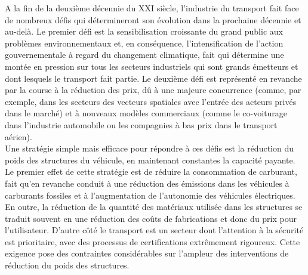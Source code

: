 A la fin de la deuxi\`eme d\'ecennie du XXI si\`ecle, l'industrie du transport fait face de nombreux d\'efis qui d\'etermineront son \'evolution dans la prochaine d\'ecennie et au-del\`a. Le premier d\'efi est la sensibilisation croissante du grand public aux probl\`emes environnementaux et, en cons\'equence, l'intensification de l'action gouvernementale \`a regard du changement climatique, fait qui d\'etermine une mont\'ee en pression sur tous les secteurs industriels qui sont grands \'emetteurs et dont lesquels le transport fait partie. Le deuxi\`eme d\'efi est repr\'esent\'e en revanche par la course \`a la r\'eduction des prix, d\^u \`a une majeure concurrence (comme, par exemple, dans les secteurs des vecteurs spatiales avec l'entr\'ee des acteurs priv\'es dans le march\'e) et \`a nouveaux mod\`eles commerciaux (comme le co-voiturage dans l'industrie automobile ou les compagnies \`a bas prix dans le transport a\'erien).\\
Une strat\'egie simple mais efficace pour r\'epondre \`a ces d\'efis est la r\'eduction du poids des structures du v\'ehicule, en maintenant constantes la capacit\'e payante. Le premier effet de cette strat\'egie est de r\'eduire la consommation de carburant, fait qu'en revanche conduit \`a une r\'eduction des \'emissions dans les v\'ehicules \`a carburants fossiles et \`a l'augmentation de l'autonomie des v\'ehicules \'electriques. En outre, la r\'eduction de la quantit\'e des mat\'eriaux utilis\'ee dans les structures se traduit souvent en une r\'eduction des co\^uts de fabrications et donc du prix pour l'utilisateur. D'autre c\^ot\'e le transport est un secteur dont l'attention \`a la s\'ecurit\'e est prioritaire, avec des processus de certifications extr\^emement rigoureux. Cette exigence pose des contraintes consid\'erables sur l'ampleur des interventions de r\'eduction du poids des structures.\\
